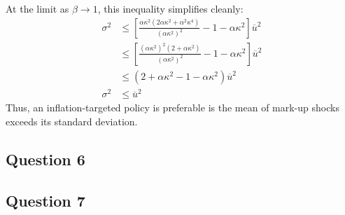 \documentclass{article}
\begin{document}
At the limit as $\beta\rightarrow 1$, this inequality simplifies cleanly:
\begin{align*}
	\sigma^2 	&\leq \left[\frac{\alpha\kappa^2(2\alpha\kappa^2 + \alpha^2\kappa^4)}{(\alpha\kappa^2)^2} - 1-\alpha\kappa^2\right]\overline{u}^2	\\
				&\leq \left[\frac{(\alpha\kappa^2)^2(2 + \alpha\kappa^2)}{(\alpha\kappa^2)^2} - 1-\alpha\kappa^2\right]\overline{u}^2				\\
				&\leq \left(2 + \alpha\kappa^2 - 1-\alpha\kappa^2\right)\overline{u}^2																\\
	\sigma^2 	&\leq \overline{u}^2	
\end{align*}
Thus, an inflation-targeted policy is preferable is the mean of mark-up shocks exceeds its standard deviation.




\subsection*{Question 6}





\subsection*{Question 7}




\end{document}
